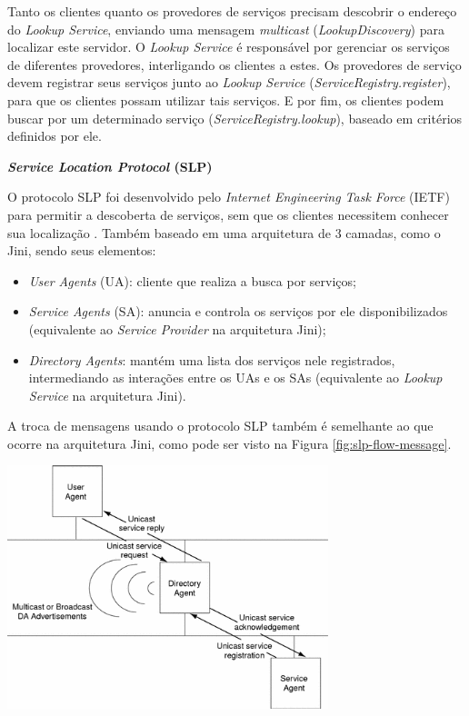 Tanto os clientes quanto os provedores de serviços precisam descobrir o endereço do \textit{Lookup Service}, enviando uma mensagem \textit{multicast} (\textit{LookupDiscovery}) para localizar este servidor. O \textit{Lookup Service} é responsável por gerenciar os serviços de diferentes provedores, interligando os clientes a estes.
Os provedores de serviço devem registrar seus serviços junto ao \textit{Lookup Service} (\textit{ServiceRegistry.register}), para que os clientes possam utilizar tais serviços. E por fim, os clientes podem buscar por um determinado serviço (\textit{ServiceRegistry.lookup}), baseado em critérios definidos por ele.

\textbf{\textit{Service Location Protocol} (SLP)}

O protocolo SLP foi desenvolvido pelo \textit{Internet Engineering Task Force} (IETF)  para permitir a descoberta de serviços, sem que os clientes necessitem conhecer sua localização \cite{borges2007arquitetura}. Também baseado em uma arquitetura de 3 camadas, como o Jini, sendo seus elementos:

\begin{itemize}
	\item \textit{User Agents} (UA): cliente que realiza a busca por serviços;
  \item \textit{Service Agents} (SA): anuncia e controla os serviços por ele disponibilizados (equivalente ao \textit{Service Provider} na arquitetura Jini);
  \item \textit{Directory Agents}: mantém uma lista dos serviços nele registrados, intermediando as interações entre os UAs e os SAs (equivalente ao \textit{Lookup Service} na arquitetura Jini).
\end{itemize}

A troca de mensagens usando o protocolo SLP também é semelhante ao que ocorre na arquitetura Jini, como pode ser visto na Figura \ref{fig:slp-flow-message}.

\begin{center}
	\includegraphics[width=0.7\textwidth]{images/slp-flow-message.png}
	\label{fig:slp-flow-message}
\end{center}

